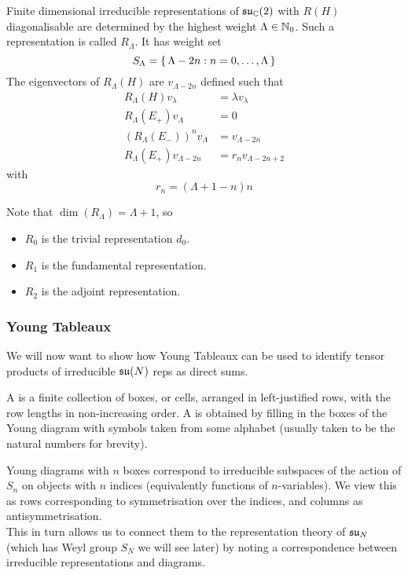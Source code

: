 \documentclass{article}
\begin{document}
\begin{theorem}
	Finite dimensional irreducible representations of $\mathfrak{su}_{\mathbb{C}}(2)$ with $R(H)$ diagonalisable are determined by the highest weight $\Lambda\in\mathbb{N}_0$. Such a representation is called $R_\Lambda$. It has weight set 
	\[
	S_\Lambda=\set{  \Lambda-2n : n=0,\dots,\Lambda  }
	\]
	The eigenvectors of $R_\Lambda(H)$ are $v_{\Lambda-2n}$ defined such that 
	\begin{align*}
		R_\Lambda(H) v_\lambda &= \lambda v_\lambda \\
		R_\Lambda(E_+) v_\Lambda &= 0 \\
		\left(R_\Lambda(E_-)\right)^n v_{\Lambda} &= v_{\Lambda-2n} \\
		R_\Lambda(E_+) v_{\Lambda-2n} &= r_n v_{\Lambda-2n+2}
	\end{align*}
	with 
	\[
	r_n=(\Lambda+1-n)n
	\]
\end{theorem}
Note that $\dim(R_\Lambda)=\Lambda+1$, so 
\begin{itemize}
	\item $R_0$ is the trivial representation $d_0$.
	\item $R_1$ is the fundamental representation.
	\item $R_2$ is the adjoint representation. 
\end{itemize}

\subsubsection{Young Tableaux}
We will now want to show how Young Tableaux can be used to identify tensor products of irreducible $\mathfrak{su}(N)$ reps as direct sums. 

\begin{definition}
	A  is a finite collection of boxes, or cells, arranged in left-justified rows, with the row lengths in non-increasing order. A  is obtained by filling in the boxes of the Young diagram with symbols taken from some alphabet (usually taken to be the natural numbers for brevity). 
\end{definition}

Young diagrams with $n$ boxes correspond to irreducible subspaces of the action of $S_n$ on objects with $n$ indices (equivalently functions of $n$-variables). We view this as rows corresponding to symmetrisation over the indices, and columns as antisymmetrisation. \\
This in turn allows us to connect them to the representation theory of $\mathfrak{su}_N$ (which has Weyl group $S_N$ we will see later) by noting a correspondence between irreducible representations and diagrams. 
\end{document}
